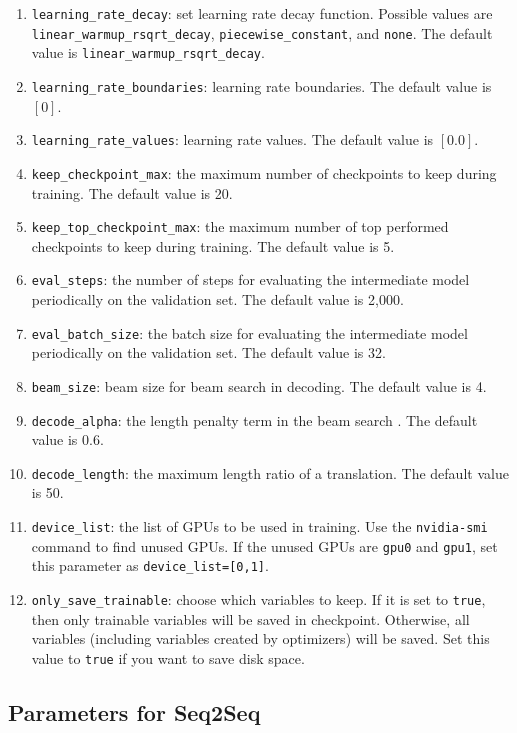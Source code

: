 \documentclass{article}
\begin{document}
\begin{enumerate}
\item \verb|learning_rate_decay|: set learning rate decay function. Possible values are \verb|linear_warmup_rsqrt_decay|, \verb|piecewise_constant|, and \verb|none|. The default value is \verb|linear_warmup_rsqrt_decay|.
\item \verb|learning_rate_boundaries|: learning rate boundaries. The default value is $[0]$.
\item \verb|learning_rate_values|: learning rate values. The default value is $[0.0]$.
\item \verb|keep_checkpoint_max|: the maximum number of checkpoints to keep during training. The default value is 20.
\item \verb|keep_top_checkpoint_max|: the maximum number of top performed checkpoints to keep during training. The default value is 5.
\item \verb|eval_steps|: the number of steps for evaluating the intermediate model periodically on the validation set. The default value is 2,000.
\item \verb|eval_batch_size|: the batch size for evaluating the intermediate model periodically on the validation set. The default value is 32.
\item \verb|beam_size|: beam size for beam search in decoding. The default value is 4.
\item \verb|decode_alpha|: the length penalty term in the beam search \citep{Wu:16}. The default value is 0.6.
\item \verb|decode_length|: the maximum length ratio of a translation. The default value is 50.
\item \verb|device_list|: the list of GPUs to be used in training. Use the \verb|nvidia-smi| command to find unused GPUs. If the unused GPUs are \verb|gpu0| and \verb|gpu1|, set this parameter as \verb|device_list=[0,1]|.
\item \verb|only_save_trainable|: choose which variables to keep. If it is set to \verb|true|, then only trainable variables will be saved in checkpoint. Otherwise, all variables (including variables created by optimizers) will be saved. Set this value to \verb|true| if you want to save disk space.
\end{enumerate}

\subsection{Parameters for Seq2Seq}
\end{document}
